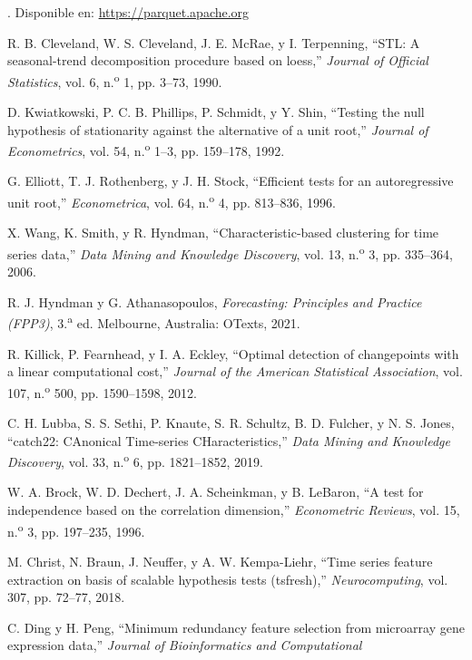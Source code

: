 \documentclass[12pt,letterpaper]{report}
\begin{document}
\begin{enumerate}[label={[\arabic*]}, leftmargin=*, itemsep=2pt]
[En línea]. Disponible en: \url{https://parquet.apache.org}
\item\label{bib:12} R. B. Cleveland, W. S. Cleveland, J. E. McRae, y I. Terpenning, ``STL: A seasonal-trend decomposition procedure based on loess,'' \textit{Journal of Official Statistics}, vol. 6, n.\textsuperscript{o} 1, pp. 3--73, 1990.
\item\label{bib:13} D. Kwiatkowski, P. C. B. Phillips, P. Schmidt, y Y. Shin, ``Testing the null hypothesis of stationarity against the alternative of a unit root,'' \textit{Journal of Econometrics}, vol. 54, n.\textsuperscript{o} 1--3, pp. 159--178, 1992.
\item\label{bib:14} G. Elliott, T. J. Rothenberg, y J. H. Stock, ``Efficient tests for
an autoregressive unit root,'' \textit{Econometrica}, vol. 64, n.\textsuperscript{o} 4,
pp. 813--836, 1996.
\item\label{bib:15} X. Wang, K. Smith, y R. Hyndman, ``Characteristic-based
clustering for time series data,'' \textit{Data Mining and Knowledge Discovery},
vol. 13, n.\textsuperscript{o} 3, pp. 335--364, 2006.
\item\label{bib:16} R. J. Hyndman y G. Athanasopoulos, \textit{Forecasting: Principles and Practice (FPP3)}, 3.\textsuperscript{a} ed. Melbourne, Australia: OTexts, 2021.
\item\label{bib:17} R. Killick, P. Fearnhead, y I. A. Eckley, ``Optimal detection of
changepoints with a linear computational cost,'' \textit{Journal of the American
Statistical Association}, vol. 107, n.\textsuperscript{o} 500, pp. 1590--1598, 2012.
\item\label{bib:18} C. H. Lubba, S. S. Sethi, P. Knaute, S. R. Schultz, B. D. Fulcher,
y N. S. Jones, ``catch22: CAnonical Time-series CHaracteristics,'' \textit{Data Mining
and Knowledge Discovery}, vol. 33, n.\textsuperscript{o} 6, pp. 1821--1852, 2019.
\item\label{bib:19} W. A. Brock, W. D. Dechert, J. A. Scheinkman, y B. LeBaron, ``A test
for independence based on the correlation dimension,'' \textit{Econometric Reviews},
vol. 15, n.\textsuperscript{o} 3, pp. 197--235, 1996.
\item\label{bib:20} M. Christ, N. Braun, J. Neuffer, y A. W. Kempa-Liehr, ``Time series
feature extraction on basis of scalable hypothesis tests (tsfresh),''
\textit{Neurocomputing}, vol. 307, pp. 72--77, 2018.
\item\label{bib:21} C. Ding y H. Peng, ``Minimum redundancy feature selection from
microarray gene expression data,'' \textit{Journal of Bioinformatics and Computational
}
\end{enumerate}
\end{document}
